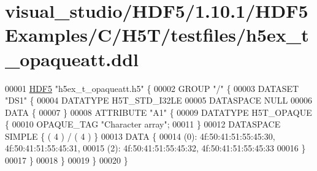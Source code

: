 \hypertarget{visual__studio_2_h_d_f5_21_810_81_2_h_d_f5_examples_2_c_2_h5_t_2testfiles_2h5ex__t__opaqueatt_8ddl_source}{}\section{visual\+\_\+studio/\+H\+D\+F5/1.10.1/\+H\+D\+F5\+Examples/\+C/\+H5\+T/testfiles/h5ex\+\_\+t\+\_\+opaqueatt.ddl}
\label{visual__studio_2_h_d_f5_21_810_81_2_h_d_f5_examples_2_c_2_h5_t_2testfiles_2h5ex__t__opaqueatt_8ddl_source}

\begin{DoxyCode}
00001 \hyperlink{namespace_h_d_f5}{HDF5} \textcolor{stringliteral}{"h5ex\_t\_opaqueatt.h5"} \{
00002 GROUP \textcolor{stringliteral}{"/"} \{
00003    DATASET \textcolor{stringliteral}{"DS1"} \{
00004       DATATYPE  H5T\_STD\_I32LE
00005       DATASPACE  NULL
00006       DATA \{
00007       \}
00008       ATTRIBUTE \textcolor{stringliteral}{"A1"} \{
00009          DATATYPE  H5T\_OPAQUE \{
00010             OPAQUE\_TAG \textcolor{stringliteral}{"Character array"};
00011          \}
00012          DATASPACE  SIMPLE \{ ( 4 ) / ( 4 ) \}
00013          DATA \{
00014          (0): 4f:50:41:51:55:45:30, 4f:50:41:51:55:45:31,
00015          (2): 4f:50:41:51:55:45:32, 4f:50:41:51:55:45:33
00016          \}
00017       \}
00018    \}
00019 \}
00020 \}
\end{DoxyCode}
